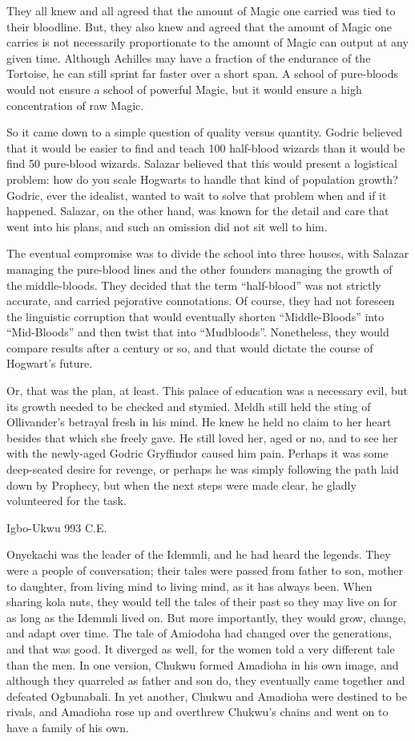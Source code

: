 They all knew and all agreed that the amount of Magic one carried was tied to their bloodline. But, they also knew and agreed that the amount of Magic one carries is not necessarily proportionate to the amount of Magic can output at any given time. Although Achilles may have a fraction of the endurance of the Tortoise, he can still sprint far faster over a short span. A school of pure-bloods would not ensure a school of powerful Magic, but it would ensure a high concentration of raw Magic.

So it came down to a simple question of quality versus quantity. Godric believed that it would be easier to find and teach 100 half-blood wizards than it would be find 50 pure-blood wizards. Salazar believed that this would present a logistical problem: how do you scale Hogwarts to handle that kind of population growth? Godric, ever the idealist, wanted to wait to solve that problem when and if it happened. Salazar, on the other hand, was known for the detail and care that went into his plans, and such an omission did not sit well to him.

The eventual compromise was to divide the school into three houses, with Salazar managing the pure-blood lines and the other founders managing the growth of the middle-bloods. They decided that the term “half-blood” was not strictly accurate, and carried pejorative connotations. Of course, they had not foreseen the linguistic corruption that would eventually shorten “Middle-Bloods” into “Mid-Bloods” and then twist that into “Mudbloods”. Nonetheless, they would compare results after a century or so, and that would dictate the course of Hogwart’s future.

Or, that was the plan, at least. This palace of education was a necessary evil, but its growth needed to be checked and stymied. Meldh still held the sting of Ollivander’s betrayal fresh in his mind. He knew he held no claim to her heart besides that which she freely gave. He still loved her, aged or no, and to see her with the newly-aged Godric Gryffindor caused him pain. Perhaps it was some deep-seated desire for revenge, or perhaps he was simply following the path laid down by Prophecy, but when the next steps were made clear, he gladly volunteered for the task.

Igbo-Ukwu
993 C.E.

Onyekachi was the leader of the Idemmli, and he had heard the legends. They were a people of conversation; their tales were passed from father to son, mother to daughter, from living mind to living mind, as it has always been. When sharing kola nuts, they would tell the tales of their past so they may live on for as long as the Idemmli lived on. But more importantly, they would grow, change, and adapt over time. The tale of Amiodoha had changed over the generations, and that was good. It diverged as well, for the women told a very different tale than the men. In one version, Chukwu formed Amadioha in his own image, and although they quarreled as father and son do, they eventually came together and defeated Ogbunabali. In yet another, Chukwu and Amadioha were destined to be rivals, and Amadioha rose up and overthrew Chukwu’s chains and went on to have a family of his own.

